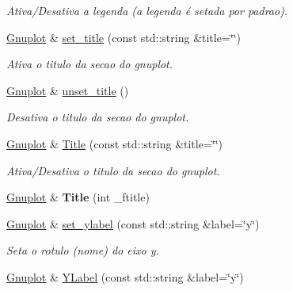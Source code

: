 \begin{DoxyCompactItemize}
\begin{DoxyCompactList}\small\item\em Ativa/\-Desativa a legenda (a legenda é setada por padrao). \end{DoxyCompactList}\item 
\hypertarget{classGnuplot_aa693e806a115af1e2776a15078e75b46}{\hyperlink{classGnuplot}{Gnuplot} \& \hyperlink{classGnuplot_aa693e806a115af1e2776a15078e75b46}{set\-\_\-title} (const std\-::string \&title=\char`\"{}\char`\"{})}\label{classGnuplot_aa693e806a115af1e2776a15078e75b46}

\begin{DoxyCompactList}\small\item\em Ativa o titulo da secao do gnuplot. \end{DoxyCompactList}\item 
\hypertarget{classGnuplot_a0d205a55ae104403292622b49af14ae7}{\hyperlink{classGnuplot}{Gnuplot} \& \hyperlink{classGnuplot_a0d205a55ae104403292622b49af14ae7}{unset\-\_\-title} ()}\label{classGnuplot_a0d205a55ae104403292622b49af14ae7}

\begin{DoxyCompactList}\small\item\em Desativa o titulo da secao do gnuplot. \end{DoxyCompactList}\item 
\hypertarget{classGnuplot_a73bb8c97a946cafea0eca683450a6a62}{\hyperlink{classGnuplot}{Gnuplot} \& \hyperlink{classGnuplot_a73bb8c97a946cafea0eca683450a6a62}{Title} (const std\-::string \&title=\char`\"{}\char`\"{})}\label{classGnuplot_a73bb8c97a946cafea0eca683450a6a62}

\begin{DoxyCompactList}\small\item\em Ativa/\-Desativa o titulo da secao do gnuplot. \end{DoxyCompactList}\item 
\hypertarget{classGnuplot_afeab18e210616ae239adb7d816ecb2e9}{\hyperlink{classGnuplot}{Gnuplot} \& {\bfseries Title} (int \-\_\-ftitle)}\label{classGnuplot_afeab18e210616ae239adb7d816ecb2e9}

\item 
\hypertarget{classGnuplot_a7654b86e3873aec4c5101abb466fe4ab}{\hyperlink{classGnuplot}{Gnuplot} \& \hyperlink{classGnuplot_a7654b86e3873aec4c5101abb466fe4ab}{set\-\_\-ylabel} (const std\-::string \&label=\char`\"{}y\char`\"{})}\label{classGnuplot_a7654b86e3873aec4c5101abb466fe4ab}

\begin{DoxyCompactList}\small\item\em Seta o rotulo (nome) do eixo y. \end{DoxyCompactList}\item 
\hypertarget{classGnuplot_ab4cdb8c1abd919b9851ca9a81667f2a4}{\hyperlink{classGnuplot}{Gnuplot} \& \hyperlink{classGnuplot_ab4cdb8c1abd919b9851ca9a81667f2a4}{Y\-Label} (const std\-::string \&label=\char`\"{}y\char`\"{})}\label{classGnuplot_ab4cdb8c1abd919b9851ca9a81667f2a4}


\end{DoxyCompactItemize}
